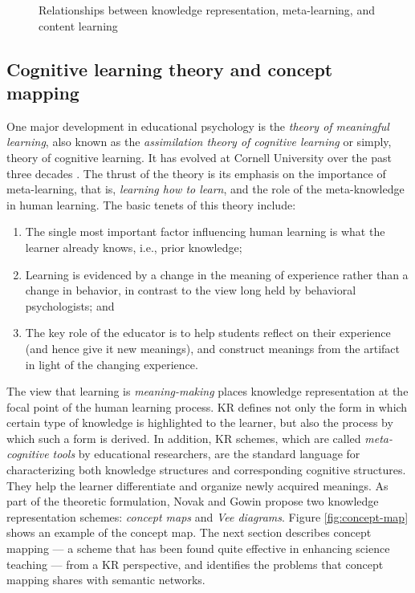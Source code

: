 \begin{figure}[htb]
  \caption{Relationships between knowledge representation, meta-learning,
  and content learning} 
  \label{fig:triangle}
\end{figure}


\subsection{Cognitive learning theory and concept mapping}
\label{sec:meaningful learning}

One major development in educational psychology is the {\it theory of
meaningful learning\/}, also known as the {\it assimilation theory of
cognitive learning\/} or simply, theory of cognitive learning. It has
evolved at Cornell University over the past three decades
\cite{Ausubel63,Novak84}.  The thrust of the theory is its emphasis on the
importance of meta-learning, that is, {\it learning how to learn\/}, and
the role of the meta-knowledge in human learning. The basic tenets of this
theory include:

\begin{enumerate}
\item The single most important factor influencing human learning is what
  the learner already knows, i.e., prior knowledge;
  
\item Learning is evidenced by a change in the meaning of experience
  rather than a change in behavior, in contrast to the view long held by
  behavioral psychologists; and
  
\item The key role of the educator is to help students reflect on their
  experience (and hence give it new meanings), and construct meanings from
  the artifact in light of the changing experience.
\end{enumerate}

The view that learning is {\it meaning-making\/} places knowledge
representation at the focal point of the human learning process. KR defines
not only the form in which certain type of knowledge is highlighted to the
learner, but also the process by which such a form is derived.  In
addition, KR schemes, which are called {\it meta-cognitive tools\/} by
educational researchers, are the standard language for characterizing both
knowledge structures and corresponding cognitive structures. They help the
learner differentiate and organize newly acquired meanings. As part of the
theoretic formulation, Novak and Gowin \cite{Novak84} propose two knowledge
representation schemes: {\it concept maps\/} and {\it Vee diagrams\/}.
Figure \ref{fig:concept-map} shows an example of the concept map.  The next
section describes concept mapping --- a scheme that has been found quite
effective in enhancing science teaching \cite{Cliburn90,Novak90,Roth92} --- 
from a KR perspective, and identifies the problems that concept mapping
shares with semantic networks.


